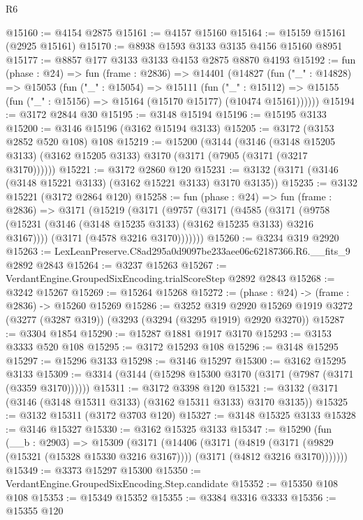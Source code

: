 \begin{lexlean}{R6}
\begin{coremodule}
@15160 := @4154 @2875
@15161 := @4157 @15160
@15164 := @15159 @15161 (@2925 @15161)
@15170 := @8938 @1593 @3133 @3135 @4156 @15160 @8951
@15177 := @8857 @177 @3133 @3133 @4153 @2875 @8870 @4193
@15192 := fun (phase : @24) =>
  fun (frame : @2836) =>
  @14401
    (@14827
      (fun ("_" : @14828) =>
      @15053
        (fun ("_" : @15054) =>
        @15111
          (fun ("_" : @15112) =>
          @15155 (fun ("_" : @15156) => @15164 (@15170 @15177) (@10474 @15161))))))
@15194 := @3172 @2844 @30
@15195 := @3148 @15194
@15196 := @15195 @3133
@15200 := @3146 @15196 (@3162 @15194 @3133)
@15205 := @3172 (@3153 @2852 @520 @108) @108
@15219 := @15200
    (@3144
      (@3146 (@3148 @15205 @3133) (@3162 @15205 @3133) @3170 (@3171 (@7905 (@3171 (@3217 @3170))))))
@15221 := @3172 @2860 @120
@15231 := @3132 (@3171 (@3146 (@3148 @15221 @3133) (@3162 @15221 @3133) @3170 @3135))
@15235 := @3132 @15221 (@3172 @2864 @120)
@15258 := fun (phase : @24) =>
  fun (frame : @2836) =>
  @3171
    (@15219
      (@3171
        (@9757
          (@3171
            (@4585
              (@3171 (@9758 (@15231 (@3146 (@3148 @15235 @3133) (@3162 @15235 @3133) @3216 @3167))))
              (@3171 (@4578 @3216 @3170)))))))
@15260 := @3234 @319 @2920
@15263 := LexLeanPreserve.C8ad295a0d9097be233aee06c62187366.R6.__fits_9 @2892 @2843
@15264 := @3237 @15263
@15267 := VerdantEngine.GroupedSixEncoding.trialScoreStep @2892 @2843
@15268 := @3242 @15267
@15269 := @15264 @15268
@15272 := (phase : @24) -> (frame : @2836) -> @15260 @15269
@15286 := @3252
    @319
    @2920
    @15269
    @1919
    @3272
    (@3277 (@3287 @319))
    (@3293 (@3294 (@3295 @1919) @2920 @3270))
@15287 := @3304 @1854
@15290 := @15287 @1881 @1917 @3170
@15293 := @3153 @3333 @520 @108
@15295 := @3172 @15293 @108
@15296 := @3148 @15295
@15297 := @15296 @3133
@15298 := @3146 @15297
@15300 := @3162 @15295 @3133
@15309 := @3314 (@3144 (@15298 @15300 @3170 (@3171 (@7987 (@3171 (@3359 @3170))))))
@15311 := @3172 @3398 @120
@15321 := @3132 (@3171 (@3146 (@3148 @15311 @3133) (@3162 @15311 @3133) @3170 @3135))
@15325 := @3132 @15311 (@3172 @3703 @120)
@15327 := @3148 @15325 @3133
@15328 := @3146 @15327
@15330 := @3162 @15325 @3133
@15347 := @15290
    (fun (__b : @2903) =>
    @15309
      (@3171
        (@14406
          (@3171
            (@4819
              (@3171 (@9829 (@15321 (@15328 @15330 @3216 @3167))))
              (@3171 (@4812 @3216 @3170)))))))
@15349 := @3373 @15297 @15300
@15350 := VerdantEngine.GroupedSixEncoding.Step.candidate
@15352 := @15350 @108 @108
@15353 := @15349 @15352
@15355 := @3384 @3316 @3333
@15356 := @15355 @120

\end{coremodule}
\end{lexlean}
